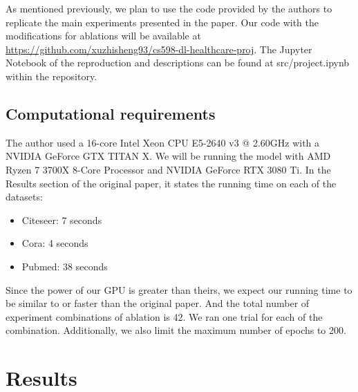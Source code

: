 \documentclass[11pt,a4paper]{article}
\begin{document}
As mentioned previously, we plan to use the code provided by the authors to replicate the main experiments presented in the paper. Our code with the modifications for ablations will be available at \url{https://github.com/xuzhisheng93/cs598-dl-healthcare-proj}. The Jupyter Notebook of the reproduction and descriptions can be found at src/project.ipynb within the repository.

\subsection{Computational requirements}

The author used a 16-core Intel Xeon CPU E5-2640 v3 @ 2.60GHz with a NVIDIA GeForce GTX TITAN X. We will be running the model with AMD Ryzen 7 3700X 8-Core Processor and NVIDIA GeForce RTX 3080 Ti. In the Results section of the original paper, it states the running time on each of the datasets:

\begin{itemize}
  \item Citeseer: 7 seconds
  \item Cora: 4 seconds
  \item Pubmed: 38 seconds
\end{itemize}

Since the power of our GPU is greater than theirs, we expect our running time to be similar to or faster than the original paper. And the total number of experiment combinations of ablation is 42. We ran one trial for each of the combination. Additionally, we also limit the maximum number of epochs to 200.

\section{Results}
\end{document}
